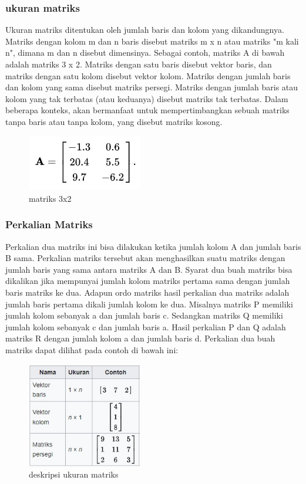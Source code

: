 \documentclass[conference]{IEEEtran}
\begin{document}
\subsubsection{ukuran matriks}
Ukuran matriks ditentukan oleh jumlah baris dan kolom yang dikandungnya. Matriks dengan kolom m dan n baris disebut matriks m x n atau matriks "m kali n", dimana m dan n disebut dimensinya. Sebagai contoh, matriks A di bawah adalah matriks 3 x 2. Matriks dengan satu baris disebut vektor baris, dan matriks dengan satu kolom disebut vektor kolom. Matriks dengan jumlah baris dan kolom yang sama disebut matriks persegi. Matriks dengan jumlah baris atau kolom yang tak terbatas (atau keduanya) disebut matriks tak terbatas. Dalam beberapa konteks, akan bermanfaat untuk mempertimbangkan sebuah matriks tanpa baris atau tanpa kolom, yang disebut matriks kosong.

\begin{figure}[htbp]
    \includegraphics[width=5cm]{gambar/contoh.jpg}
    \centering
    \caption{matriks 3x2}   
\end{figure}

\subsubsection{Perkalian Matriks}
Perkalian dua matriks ini bisa dilakukan ketika jumlah kolom A dan jumlah baris B sama. Perkalian matriks tersebut akan menghasilkan suatu matriks dengan jumlah baris yang sama antara matriks A dan B. Syarat dua buah matriks bisa dikalikan jika mempunyai jumlah kolom matriks pertama sama dengan jumlah baris matriks ke dua. Adapun ordo matriks hasil perkalian dua matriks adalah jumlah baris pertama dikali jumlah kolom ke dua.
Misalnya matriks P memiliki jumlah kolom sebanyak a dan jumlah baris c. Sedangkan matriks Q memiliki jumlah kolom sebanyak c dan jumlah baris a. Hasil perkalian P dan Q adalah matriks R dengan jumlah kolom a dan jumlah baris d.
Perkalian dua buah matriks dapat dilihat pada contoh di bawah ini:
\begin{figure}[htbp]
    \includegraphics[width=5cm]{tabel_matriks.jpg}
    \centering
    \caption{deskripsi ukuran matriks}        
\end{figure}
\end{document}
